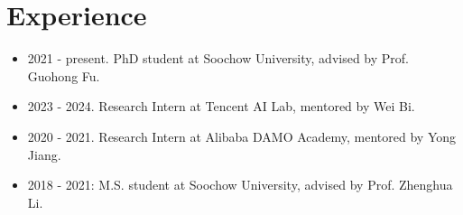 \documentclass[a4paper,12pt]{article}
\begin{document}
\section{Experience}
\begin{itemize}[leftmargin=18pt]
\item 2021 - present. PhD student at Soochow University, advised by Prof. Guohong Fu.
\item 2023 - 2024. Research Intern at Tencent AI Lab, mentored by Wei Bi.
\item 2020 - 2021. Research Intern at Alibaba DAMO Academy, mentored by Yong Jiang.
\item 2018 - 2021: M.S. student at Soochow University, advised by Prof. Zhenghua Li.
\end{itemize}
\end{document}
